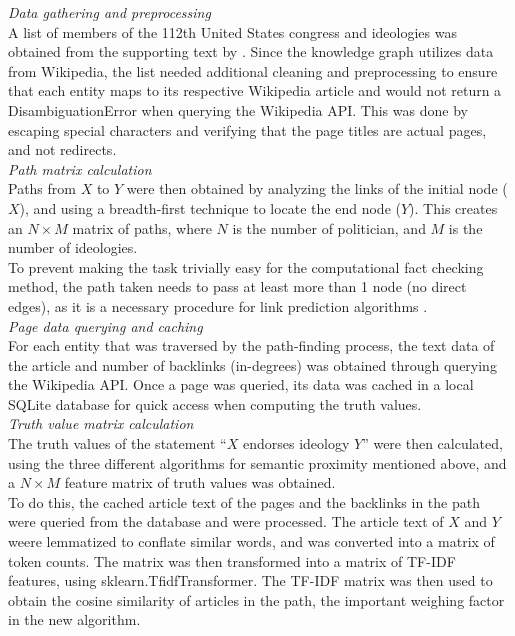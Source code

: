 \documentclass[10pt,11pt,12pt,oneside]{book}
\begin{document}
\textit{Data gathering and preprocessing}\\

A list of members of the 112th United States congress and ideologies was obtained from the supporting text by \cite{ciampaglia2015computational}. Since the knowledge graph utilizes data from Wikipedia, the list needed additional cleaning and preprocessing to ensure that each entity maps to its respective Wikipedia article and would not return a DisambiguationError when querying the Wikipedia API. This was done by escaping special characters and verifying that the page titles are actual pages, and not redirects.\\

\textit{Path matrix calculation}\\

Paths from $X$ to $Y$ were then obtained by analyzing the links of the initial node ($X$), and using a breadth-first technique to locate the end node ($Y$). This creates an $N \times M$ matrix of paths, where $N$ is the number of politician, and $M$ is the number of ideologies.\\

To prevent making the task trivially easy for the computational fact checking method, the path taken needs to pass at least more than 1 node (no direct edges), as it is a necessary procedure for link prediction algorithms \cite{liben-nowell_kleinberg_2007}.\\

\textit{Page data querying and caching}\\

For each entity that was traversed by the path-finding process, the text data of the article and number of backlinks (in-degrees) was obtained through querying the Wikipedia API. Once a page was queried, its data was cached in a local SQLite database for quick access when computing the truth values.\\

\textit{Truth value matrix calculation}\\

The truth values of the statement “$X$ endorses ideology $Y$” were then calculated, using the three different algorithms for semantic proximity mentioned above, and a $N \times M$ feature matrix of truth values was obtained.\\

To do this, the cached article text of the pages and the backlinks in the path were queried from the database and were processed. The article text of $ X $ and $ Y $ weere lemmatized to conflate similar words, and was converted into a matrix of token counts. The matrix was then transformed into a matrix of TF-IDF features, using sklearn.TfidfTransformer. The TF-IDF matrix was then used to obtain the cosine similarity of articles in the path, the important weighing factor in the new algorithm.\\
\end{document}
